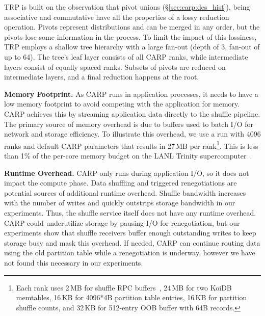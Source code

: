 TRP is built on the observation that pivot unions (\S\ref{sec:carp:des_hist}), being associative
and commutative have all the properties of a lossy reduction operation.
Pivots represent distributions and can be merged in any order, but the pivots lose some information
in the process.
To limit the impact of this lossiness, TRP employs a shallow tree hierarchy with a large fan-out
(depth of 3, fan-out of up to 64).
The tree's leaf layer consists of all CARP ranks, while intermediate layers consist of equally
spaced ranks.
Subsets of pivots are reduced on intermediate layers, and a final reduction happens at the root.

\textbf{Memory Footprint.
}
As CARP runs in application processes, it needs to have a low memory footprint to avoid competing
with the application for memory.
CARP achieves this by streaming application data directly to the shuffle pipeline.
The primary source of memory overhead is due to buffers used to batch I/O for network and storage
efficiency.
To illustrate this overhead, we use a run with 4096 ranks and default CARP parameters that results
in 27\,MB per rank\footnote{Each rank uses 2\,MB for shuffle RPC buffers~\cite{Zheng2018:DeltaFS},
  24\,MB for two KoiDB memtables, 16\,KB for 4096*4B partition table entries, 16\,KB for partition
  shuffle counts, and 32\,KB for 512-entry OOB buffer with 64B records.
}.
This is less than 1\% of the per-core memory budget on the LANL Trinity
supercomputer~\cite{Vigil2014:Trinity}.

\textbf{Runtime Overhead.
}
CARP only runs during application I/O, so it does not impact the compute phase.
Data shuffling and triggered renegotiations are potential sources of additional runtime overhead.
Shuffle bandwidth increases with the number of writes and quickly outstrips storage bandwidth in
our experiments.
Thus, the shuffle service itself does not have any runtime overhead.
CARP could underutilize storage by pausing I/O for renegotiation, but our experiments show that
shuffle receivers buffer enough outstanding writes to keep storage busy and mask this overhead.
If needed, CARP can continue routing data using the old partition table while a renegotiation is
underway, however we have not found this necessary in our experiments.
